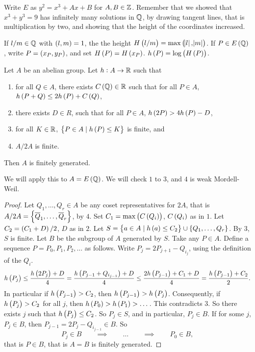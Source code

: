 
Write $ E $ as $ y^2 = x^3 + Ax + B $ for $ A, B \in \mathbb{Z} $. Remember that we showed that $ x^3 + y^3 = 9 $ has infinitely many solutions in $ \mathbb{Q} $, by drawing tangent lines, that is multiplication by two, and showing that the height of the coordinates increased.

\begin{definition}
If $ l / m \in \mathbb{Q} $ with $ \br{l, m} = 1 $, the the height $ H\br{l / m} = \max\br{\abs{l}, \abs{m}} $. If $ P \in E\br{\Q} $, write $ P = \br{x_P, y_P} $, and set $ H\br{P} = H\br{x_P} $. $ h\br{P} = \log\br{H\br{P}} $.
\end{definition}

\begin{proposition}
Let $ A $ be an abelian group. Let $ h : A \to \mathbb{R} $ such that
\begin{enumerate}
\item for all $ Q \in A $, there exists $ C\br{\Q} \in \R $ such that for all $ P \in A $, $ h\br{P + Q} \le 2h\br{P} + C\br{Q} $,
\item there exists $ D \in R $, such that for all $ P \in A $, $ h\br{2P} > 4h\br{P} - D $,
\item for all $ K \in \mathbb{R} $, $ \cbr{P \in A \mid h\br{P} \le K} $ is finite, and
\item $ A / 2A $ is finite.
\end{enumerate}
Then $ A $ is finitely generated.
\end{proposition}

We will apply this to $ A = E\br{\Q} $. We will check $ 1 $ to $ 3 $, and $ 4 $ is weak Mordell-Weil.

\begin{proof}
Let $ Q_1, \dots, Q_r \in A $ be any coset representatives for $ 2A $, that is $ A / 2A = \cbr{\overline{Q}_1, \dots, \overline{Q}_r} $, by $ 4 $. Set $ C_1 = \max\br{C\br{Q_i}} $, $ C\br{Q_i} $ as in $ 1 $. Let $ C_2 = \br{C_1 + D} / 2 $, $ D $ as in $ 2 $. Let $ S = \cbr{a \in A \mid h\br{a} \le C_2} \cup \cbr{Q_1, \dots, Q_r} $. By $ 3 $, $ S $ is finite. Let $ B $ be the subgroup of $ A $ generated by $ S $. Take any $ P \in A $. Define a sequence $ P = P_0, P_1, P_2, \dots $ as follows. Write $ P_j = 2P_{j + 1} - Q_{i_j} $, using the definition of the $ Q_i $.
$$ h\br{P_j} \le \dfrac{h\br{2P_j} + D}{4} = \dfrac{h\br{P_{j - 1} + Q_{i_{j - 1}}} + D}{4} \le \dfrac{2h\br{P_{j - 1}} + C_1 + D}{4} = \dfrac{h\br{P_{j - 1}} + C_2}{2}. $$
In particular if $ h\br{P_{j - 1}} > C_2 $, then $ h\br{P_{j - 1}} > h\br{P_j} $. Consequently, if $ h\br{P_j} > C_2 $ for all $ j $, then $ h\br{P_0} > h\br{P_1} > \dots $. This contradicts $ 3 $. So there exists $ j $ such that $ h\br{P_j} \le C_2 $. So $ P_j \in S $, and in particular, $ P_j \in B $. If for some $ j $, $ P_j \in B $, then $ P_{j - 1} = 2P_j - Q_{i_{j - 1}} \in B $. So
$$ P_j \in B \qquad \implies \qquad \dots \qquad \implies \qquad P_0 \in B, $$
that is $ P \in B $, that is $ A = B $ is finitely generated.
\end{proof}


